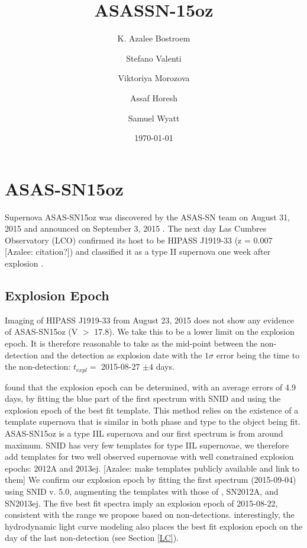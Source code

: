 \documentclass[preprint]{aastex61}
\newcommand{\azaleecomment}[1]{{\color{red} [{#1}]}}
\newcommand{\Azalee}[1]{\azaleecomment{Azalee: #1}}
\begin{document}
\title{ASASSN-15oz}
\author{K. Azalee Bostroem}

\author{Stefano Valenti}

\author{Viktoriya Morozova}

\author{Assaf Horesh}

\author{Samuel Wyatt}


\date{\today}							%

\begin{abstract}
\end{abstract}
\section{ASAS-SN15oz}
Supernova ASAS-SN15oz was discovered by the ASAS-SN team on August 31, 2015 and announced on September 3, 2015 \citep{2016brown}. 
The next day Las Cumbres Observatory (LCO) confirmed its host to be HIPASS J1919-33 (z = 0.007 \Azalee{citation?}) and classified it as a type II supernova one week after explosion \citep{2016hosseinzadeh}. 
\subsection{Explosion Epoch}
Imaging of HIPASS J1919-33 from August 23, 2015 does not show any evidence of ASAS-SN15oz (V $>$ 17.8). 
We take this to be a lower limit on the explosion epoch. 
It is therefore reasonable to take as the mid-point between the non-detection and the detection as explosion date with the $1\sigma$ error being the time to the non-detection: $t_{expl} =$ 2015-08-27 $\pm 4$ days.

\citet{2017gutierrez} found that the explosion epoch can be determined, with an average errors of 4.9 days, by fitting the blue part of the first spectrum with SNID \citep{2011blondin} and using the explosion epoch of the best fit template.
This method relies on the existence of a template supernova that is similar in both phase and type to the object being fit.
ASAS-SN15oz is a type IIL supernova and our first spectrum is from around maximum. 
SNID has very few templates for type IIL supernovae, we therefore add templates for two well observed supernovae with well constrained explosion epochs: 2012A and 2013ej.
\Azalee{make templates publicly available and link to them}
We confirm our explosion epoch by fitting the first spectrum (2015-09-04) using SNID v. 5.0, augmenting the templates with those of \citet{2017gutierrez}, SN2012A, and SN2013ej.
The five best fit spectra imply an explosion epoch of  2015-08-22, consistent with the range we propose based on non-detections.
interestingly, the hydrodynamic light curve modeling also places the best fit explosion epoch on the day of the last non-detection (see Section \ref{LC}).
\end{document}
